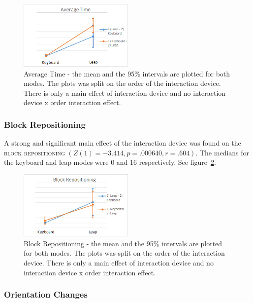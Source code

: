 \begin{figure}[H]
\centering
\includegraphics[width=0.5\textwidth]{imgs/results/average_time}
\caption{Average Time - the mean and the 95\% intervals are plotted for both modes. The plots was split on the order of the interaction device. There is only a main effect of interaction device and no interaction device x order interaction effect.}
\label{fig:average_time}
\end{figure}

\subsubsection{Block Repositioning}

A strong and significant main effect of the interaction device was found on the \textsc{block repositioning} $(Z(1) = -3.414, p = .000640, r = .604)$. The medians for the keyboard and leap modes were 0 and 16 respectively. See figure~\ref{fig:block_repositioning}.

\begin{figure}[H]
\centering
\includegraphics[width=0.5\textwidth]{imgs/results/block_repositioning}
\caption{Block Repositioning - the mean and the 95\% intervals are plotted for both modes. The plots was split on the order of the interaction device. There is only a main effect of interaction device and no interaction device x order interaction effect.}
\label{fig:block_repositioning}
\end{figure}

\subsubsection{Orientation Changes}

